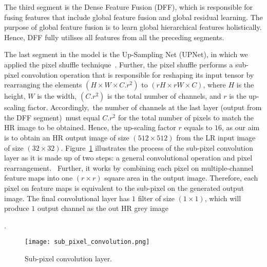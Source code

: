 The third segment is the Dense Feature Fusion (DFF), which is responsible for fusing features that include global feature fusion and global residual learning.
The purpose of global feature fusion is to learn global hierarchical features holistically.
Hence, DFF fully utilises all features from all the preceding segments.

The last segment in the model is the Up-Sampling Net (UPNet), in which we applied the pixel shuffle technique~\cite{Shi2016}.
Further, the pixel shuffle performs a sub-pixel convolution operation that is responsible for reshaping its input tensor by rearranging the elements \((H\times W\times C.r^2)\) to \((rH\times rW\times C)\), where \(H\) is the height, \(W\) is the width, \((C.r^2)\) is the total number of channels, and \(r\) is the up-scaling factor.
Accordingly, the number of channels at the last layer (output from the DFF segment) must equal \(C.r^2\) for the total number of pixels to match the HR image to be obtained.
Hence, the up-scaling factor \(r\) equals to \(16\), as our aim is to obtain an HR output image of size \((512\times 512)\) from the LR input image of size \((32\times 32)\).
Figure~\ref{fig:sub_pixel_layer} illustrates the process of the sub-pixel convolution layer as it is made up of two steps: a general convolutional operation and pixel rearrangement. 
Further, it works by combining each pixel on multiple-channel feature maps into one \((r\times r)\) square area in the output image. 
Therefore, each pixel on feature maps is equivalent to the sub-pixel on the generated output image.
The final convolutional layer has \(1\) filter of size \((1\times 1)\), which will produce \(1\) output channel as the out HR grey image\DIFaddbegin {}

\DIFaddend .
\begin{figure} [h!]
	\begin{center}
		\texttt{[image: sub\_pixel\_convolution.png]}
	\end{center}
	\caption{Sub-pixel convolution layer.} 
	\label{fig:sub_pixel_layer}
\end{figure}
